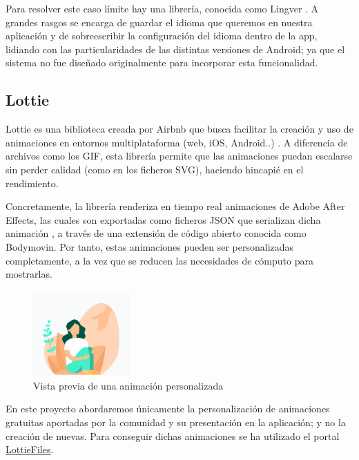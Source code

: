             Para resolver este caso límite hay una librería, conocida como Lingver \cite{berezanskyi_lingver_2023}. A 
            grandes rasgos se encarga de guardar el idioma que queremos en nuestra aplicación y de sobreescribir la 
            configuración del idioma dentro de la app, lidiando con las particularidades de las distintas versiones
            de Android; ya que el sistema no fue diseñado originalmente para incorporar esta funcionalidad.
            
        \subsection{Lottie}
            Lottie es una biblioteca creada por Airbnb que busca facilitar la creación y uso de animaciones en entornos
            multiplataforma (web, iOS, Android..) \cite{rubianes_lottie_2021}. A diferencia de archivos como los GIF, 
            esta librería permite que
            las animaciones puedan escalarse sin perder calidad (como en los ficheros SVG), haciendo hincapié en el
            rendimiento.

            Concretamente, la librería renderiza en tiempo real animaciones de Adobe After Effects, las cuales
            son exportadas como ficheros JSON que serializan dicha animación \cite{noauthor_lottie_nodate}, a través de
            una extensión de código abierto conocida como Bodymovin. Por tanto, 
            estas animaciones pueden
            ser personalizadas completamente, a la vez que se reducen las necesidades de cómputo para mostrarlas. 
            
            \begin{figure}[h]
                \centering
                \includegraphics[width=0.33\textwidth]{figures/Animacion de ejemplo.PNG}
                \caption{Vista previa de una animación personalizada}
                \label{figure:lottie:animacion_ejemplo}
            \end{figure}

            En este proyecto abordaremos únicamente la personalización de animaciones gratuitas aportadas por la 
            comunidad y su presentación en la aplicación; y no la creación de nuevas. Para conseguir dichas animaciones
            se ha utilizado el portal \href{https://lottiefiles.com/}{LottieFiles}.

